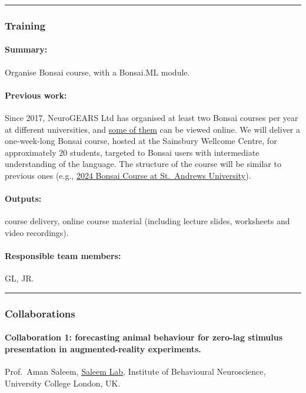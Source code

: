 \noindent\rule{\textwidth}{1pt}
\subsubsection*{Training}

\paragraph{Summary:} Organise Bonsai course, with a Bonsai.ML module.

\paragraph{Previous work:} Since 2017, NeuroGEARS Ltd has organised at least
two Bonsai courses per year at different universities, and
\href{https://bonsai-rx.org/learn/}{some of them} can be viewed online. We will
deliver a one-week-long Bonsai course, hosted at the Sainsbury Wellcome Centre,
for approximately 20 students, targeted to Bonsai users with intermediate
understanding of the language. The structure of the course will be similar to
previous ones (e.g., \href{https://neurogears.org/st-andrews-2024/}{2024 Bonsai
Course at St.~Andrews University}).

\paragraph{Outputs:} course delivery, online course material (including lecture
slides, worksheets and video recordings).

\paragraph{Responsible team members:} GL, JR.

\noindent\rule{\textwidth}{1pt}
\subsubsection*{Collaborations}

\paragraph{Collaboration 1: forecasting animal behaviour for zero-lag stimulus
presentation in augmented-reality experiments.} Prof.~Aman Saleem,
\href{https://www.saleemlab.com/}{Saleem Lab}, Institute of Behavioural
Neuroscience, University College London, UK.



